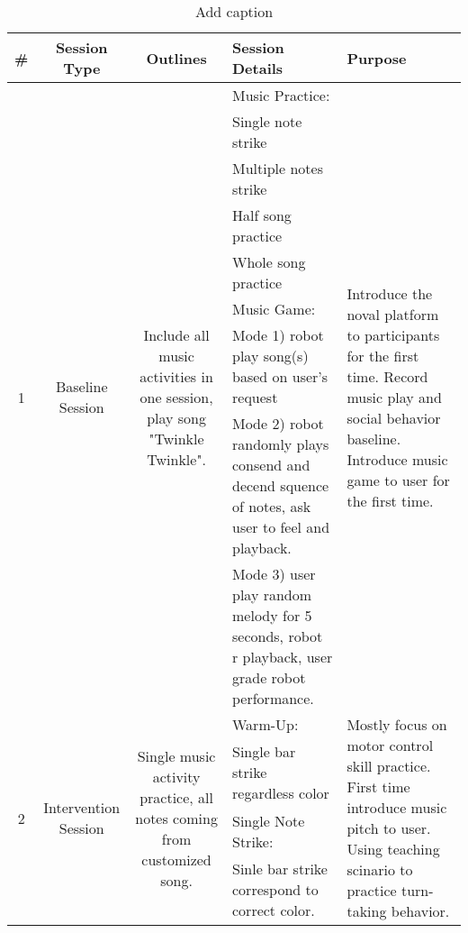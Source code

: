 \begin{table}[htbp]
  \centering
  \caption{Add caption}
    \begin{tabular}{|c|c|c|p{16.07em}|l|}
    \toprule
    \multicolumn{1}{|p{1.855em}|}{ \#} & \multicolumn{1}{p{6.715em}|}{Session Type} & \multicolumn{1}{p{6.57em}|}{Outlines} & Session Details & \multicolumn{1}{p{10.57em}|}{Purpose} \\
    \midrule
    \multirow{9}[2]{*}{1} & \multicolumn{1}{c|}{\multirow{9}[2]{*}{Baseline Session}} & \multicolumn{1}{c|}{\multirow{9}[2]{*}{Include all music activities in one session, play song "Twinkle Twinkle".}} & Music Practice: & \multicolumn{1}{l|}{\multirow{9}[2]{*}{Introduce the noval platform to participants for the first time. Record music play and social behavior baseline. Introduce music game to user for the first time.}} \\
          &       &       & Single note strike &  \\
          &       &       & Multiple notes strike &  \\
          &       &       & Half song practice &  \\
          &       &       & Whole song practice &  \\
          &       &       & Music Game: &  \\
          &       &       & Mode 1) robot play song(s) based on user's request &  \\
          &       &       & Mode 2) robot randomly plays consend and decend squence of notes, ask user to feel and playback. &  \\
          &       &       & Mode 3) user play random melody for 5 seconds, robot r playback, user grade robot performance. &  \\
    \midrule
    \multirow{6}[2]{*}{2} & \multicolumn{1}{c|}{\multirow{24}[8]{*}{Intervention Session}} & \multicolumn{1}{c|}{\multirow{6}[2]{*}{Single music activity practice, all notes coming from customized song.}} & Warm-Up: & \multicolumn{1}{l|}{\multirow{6}[2]{*}{Mostly focus on motor control skill practice. First time introduce music pitch to user. Using teaching scinario to practice turn-taking behavior. }} \\
          &       &       & Single bar strike regardless color &  \\
          &       &       & Single Note Strike: &  \\
          &       &       & Sinle bar strike correspond to correct color. &  \\

\end{tabular}
\end{table}
